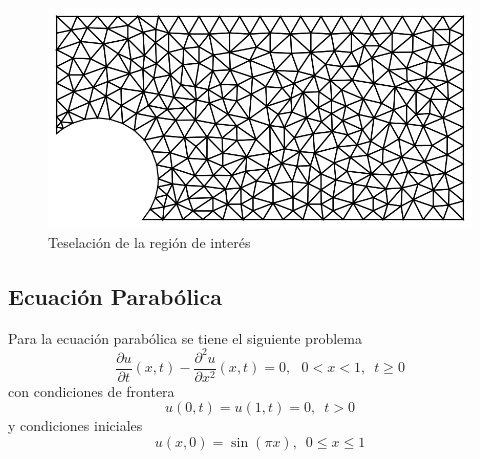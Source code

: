 \documentclass[a4paper]{article}
\begin{document}
\begin{figure}[H]
\begin{center}
\includegraphics[scale=0.42]{./elliptic_omega_mesh.png} 
\end{center} 
\caption{Teselación de la región de interés}
\label{fig::fig4}
\end{figure}

\subsection{Ecuación Parabólica}
Para la ecuación parabólica se tiene el siguiente problema
\begin{equation}
\frac{\partial u}{\partial t}(x,t)-\frac{\partial^2 u}{\partial x^2}(x,t)=0,\,\,\,\,0<x<1,\,\,\,t\geq 0
\end{equation}
con condiciones de frontera
\begin{equation}
u(0,t)=u(1,t)=0,\,\,\,t>0
\end{equation}
y condiciones iniciales
\begin{equation}
u(x,0)=\sin(\pi x),\,\,\, 0 \leq x \leq 1
\end{equation}
\end{document}
